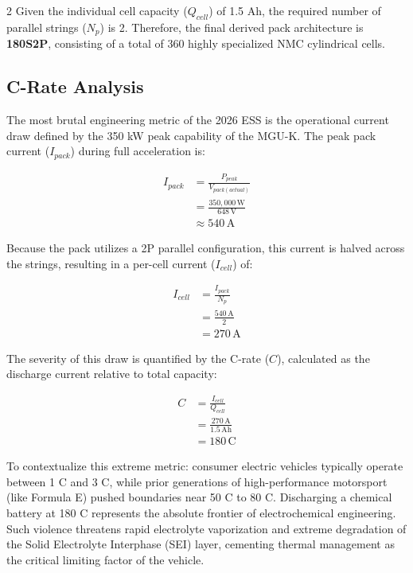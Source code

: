 \begin{multicols}{2}
Given the individual cell capacity ($Q_{cell}$) of 1.5 Ah, the required number of parallel strings ($N_p$) is 2. Therefore, the final derived pack architecture is \textbf{180S2P}, consisting of a total of 360 highly specialized NMC cylindrical cells.

\subsection{C-Rate Analysis}

The most brutal engineering metric of the 2026 ESS is the operational current draw defined by the 350 kW peak capability of the MGU-K. The peak pack current ($I_{pack}$) during full acceleration is:

\begin{equation} \label{eq:pack_current}
\begin{split}
I_{pack} &= \frac{P_{peak}}{V_{pack(actual)}} \\
&= \frac{350,000\,\mathrm{W}}{648\,\mathrm{V}} \\
&\approx 540\,\mathrm{A}
\end{split}
\end{equation}

Because the pack utilizes a 2P parallel configuration, this current is halved across the strings, resulting in a per-cell current ($I_{cell}$) of:

\begin{equation} \label{eq:cell_current}
\begin{split}
I_{cell} &= \frac{I_{pack}}{N_p} \\
&= \frac{540\,\mathrm{A}}{2} \\
&= 270\,\mathrm{A}
\end{split}
\end{equation}

The severity of this draw is quantified by the C-rate ($C$), calculated as the discharge current relative to total capacity:

\begin{equation} \label{eq:crate}
\begin{split}
C &= \frac{I_{cell}}{Q_{cell}} \\
&= \frac{270\,\mathrm{A}}{1.5\,\mathrm{Ah}} \\
&= 180\,\mathrm{C}
\end{split}
\end{equation}

To contextualize this extreme metric: consumer electric vehicles typically operate between 1 C and 3 C, while prior generations of high-performance motorsport (like Formula E) pushed boundaries near 50 C to 80 C. Discharging a chemical battery at 180 C represents the absolute frontier of electrochemical engineering. Such violence threatens rapid electrolyte vaporization and extreme degradation of the Solid Electrolyte Interphase (SEI) layer, cementing thermal management as the critical limiting factor of the vehicle.


\end{multicols}
